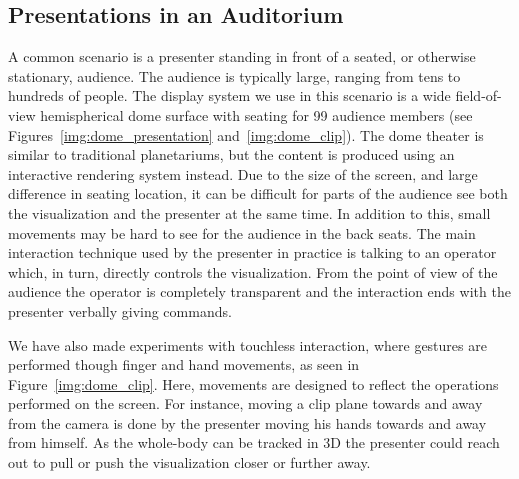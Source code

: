 \documentclass[journal]{vgtc}                %
\begin{document}
\subsection{Presentations in an Auditorium} \label{sec:largeaudience}
A common scenario is a presenter standing in front of a seated, or otherwise stationary, audience. 
The audience is typically large, ranging from tens to hundreds of people.
The display system we use in this scenario is a wide field-of-view hemispherical dome surface with seating for 99 audience members (see Figures~\ref{img:dome_presentation} and~\ref{img:dome_clip}).
The dome theater is similar to traditional planetariums, but the content is produced using an interactive rendering system instead.
Due to the size of the screen, and large difference in seating location, it can be difficult for parts of the audience see both the visualization and the presenter at the same time. 
In addition to this, small movements may be hard to see for the audience in the back seats. 
The main interaction technique used by the presenter in practice is talking to an operator which, in turn, directly controls the visualization.
From the point of view of the audience the operator is completely transparent and the interaction ends with the presenter verbally giving commands.

We have also made experiments with touchless interaction, where gestures are performed though finger and hand movements, as seen in Figure~\ref{img:dome_clip}.
Here, movements are designed to reflect the operations performed on the screen.
For instance, moving a clip plane towards and away from the camera is done by the presenter moving his hands towards and away from himself. As the whole-body can be tracked in 3D the presenter could reach out to pull or push the visualization closer or further away.

\end{document}
